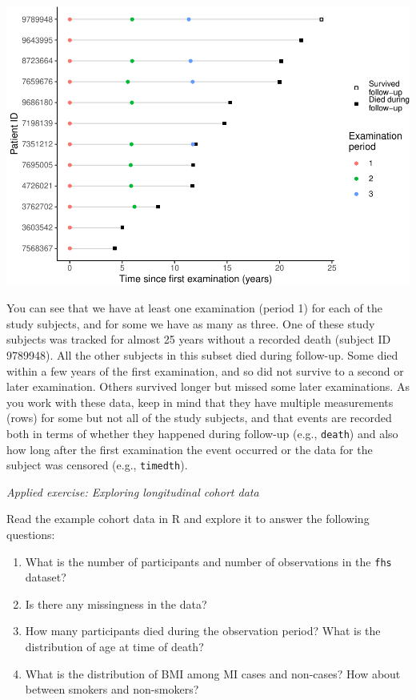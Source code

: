 \documentclass[
]{book}
\providecommand{\tightlist}{%
  \setlength{\itemsep}{0pt}\setlength{\parskip}{0pt}}
\begin{document}
\includegraphics{adv_epi_analysis_files/figure-latex/unnamed-chunk-167-1.pdf}

You can see that we have at least one examination (period 1) for each of the study subjects, and for some we have as many as three. One of these study subjects was tracked for almost 25 years without a recorded death (subject ID 9789948). All the other subjects in this subset died during follow-up. Some died within a few years of the first examination, and so did not survive to a second or later examination. Others survived longer but missed some later examinations.
As you work with these data, keep in mind that they have multiple measurements (rows) for some but not all of the study subjects, and that events are recorded both in terms of whether they happened during follow-up (e.g., \texttt{death}) and also how long after the first examination the event occurred or the data for the subject was censored (e.g., \texttt{timedth}).

\emph{Applied exercise: Exploring longitudinal cohort data}

Read the example cohort data in R and explore it to answer the following
questions:

\begin{enumerate}
\def\labelenumi{\arabic{enumi}.}
\tightlist
\item
  What is the number of participants and number of observations in the \texttt{fhs} dataset?
\item
  Is there any missingness in the data?
\item
  How many participants died during the observation period? What is the distribution of age at time of death?
\item
  What is the distribution of BMI among MI cases and non-cases? How about between smokers and non-smokers?
\end{enumerate}
\end{document}
